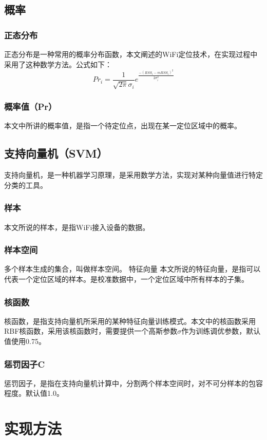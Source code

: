 \documentclass[a4paper, UTF8, twocolumn ]{ctexart}
\begin{document}
\subsection{概率}
\subsubsection{正态分布}
正态分布是一种常用的概率分布函数，本文阐述的WiFi定位技术，在实现过程中采用了这种数学方法。公式如下：
\begin{equation}
  Pr_{i}=\frac{1}{\sqrt{2\pi}\sigma_{i}}e^{\frac{-(RSS_{i}-mRSS_{i})^{2}}{2\sigma_{i}^{2}}}
\end{equation}
\subsubsection{概率值（Pr）}
本文中所讲的概率值，是指一个待定位点，出现在某一定位区域中的概率。
\subsection{支持向量机（SVM）}
支持向量机，是一种机器学习原理，是采用数学方法，实现对某种向量值进行特定分类的工具。
\subsubsection{样本}
本文所说的样本，是指WiFi接入设备的数据。
\subsubsection{样本空间}
多个样本生成的集合，叫做样本空间。
特征向量
本文所说的特征向量，是指可以代表一个定位区域的样本。是校准数据中，一个定位区域中所有样本的子集。
\subsubsection{核函数}
核函数，是指支持向量机所采用的某种特征向量训练模式。本文中的核函数采用RBF核函数，采用该核函数时，需要提供一个高斯参数$\sigma$作为训练调优参数，默认值使用0.75。
\subsubsection{惩罚因子C}
惩罚因子，是指在支持向量机计算中，分割两个样本空间时，对不可分样本的包容程度。默认值1.0。



\section{实现方法}
\end{document}

